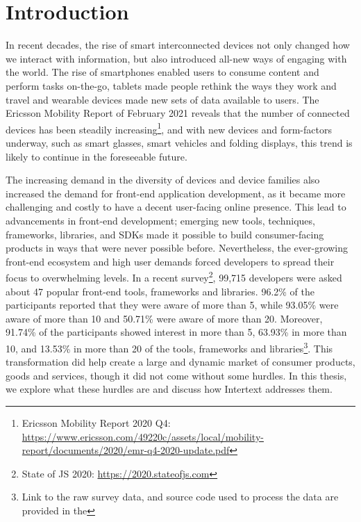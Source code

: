 
\chapter{Introduction} \label{introduction}

In recent decades, the rise of smart interconnected devices not only changed how we interact with information, but also introduced all-new ways of engaging with the world. The rise of smartphones enabled users to consume content and perform tasks on-the-go, tablets made people rethink the ways they work and travel and wearable devices made new sets of data available to users. The Ericsson Mobility Report of February 2021 reveals that the number of connected devices has been steadily increasing\footnote{Ericsson Mobility Report 2020 Q4: \url{https://www.ericsson.com/49220c/assets/local/mobility-report/documents/2020/emr-q4-2020-update.pdf}}, and with new devices and form-factors underway, such as smart glasses, smart vehicles and folding displays, this trend is likely to continue in the foreseeable future. 

The increasing demand in the diversity of devices and device families also increased the demand for front-end application development, as it became more challenging and costly to have a decent user-facing online presence. This lead to advancements in front-end development; emerging new tools, techniques, frameworks, libraries, and SDKs made it possible to build consumer-facing products in ways that were never possible before. Nevertheless, the ever-growing front-end ecosystem and high user demands forced developers to spread their focus to overwhelming levels. In a recent survey\footnote{State of JS 2020: \url{https://2020.stateofjs.com}}, 99,715 developers were asked about 47 popular front-end tools, frameworks and libraries. 96.2\% of the participants reported that they were aware of more than 5, while 93.05\% were aware of more than 10 and 50.71\% were aware of more than 20. Moreover, 91.74\% of the participants showed interest in more than 5, 63.93\% in more than 10, and 13.53\% in more than 20 of the tools, frameworks and libraries\footnote{Link to the raw survey data, and source code used to process the data are provided in the }. This transformation did help create a large and dynamic market of consumer products, goods and services, though it did not come without some hurdles. In this thesis, we explore what these hurdles are and discuss how Intertext addresses them.

